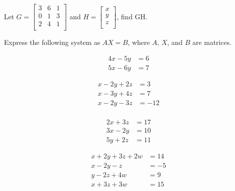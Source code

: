 \begin{puzzle}
    Let \( G = \begin{bmatrix}
        3 & 6 & 1 \\
        0 & 1 & 3 \\
        2 & 4 & 1 \\
    \end{bmatrix} \) and \( H = \begin{bmatrix}
        x \\
        y \\
        z \\
    \end{bmatrix} \), find GH.
\end{puzzle}

Express the following system as \( AX = B \), where \( A \), \( X \), and \( B \) are matrices.

\begin{puzzle}

    \[
        \begin{aligned}
            4x - 5y & = 6 \\
            5x - 6y & = 7
        \end{aligned}
    \]
\end{puzzle}

\begin{puzzle}
    \[
        \begin{aligned}
            x - 2y + 2z & = 3   \\
            x - 3y + 4z & = 7   \\
            x - 2y - 3z & = -12 \\
        \end{aligned}
    \]
\end{puzzle}

\begin{puzzle}
    \begin{align*}
        2x + 3z & = 17 \\
        3x - 2y & = 10 \\
        5y + 2z & = 11
    \end{align*}
\end{puzzle}

\begin{puzzle}
    \begin{align*}
        x + 2y + 3z + 2w & = 14 \\
        x - 2y - z       & = -5 \\
        y - 2z + 4w      & = 9  \\
        x + 3z + 3w      & = 15
    \end{align*}
\end{puzzle}